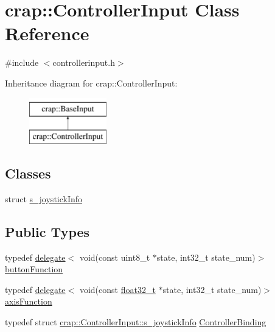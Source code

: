 \hypertarget{classcrap_1_1_controller_input}{}\section{crap\+:\+:Controller\+Input Class Reference}
\label{classcrap_1_1_controller_input}


{\ttfamily \#include $<$controllerinput.\+h$>$}

Inheritance diagram for crap\+:\+:Controller\+Input\+:\begin{figure}[H]
\begin{center}
\leavevmode
\includegraphics[height=2.000000cm]{classcrap_1_1_controller_input}
\end{center}
\end{figure}
\subsection*{Classes}
\begin{DoxyCompactItemize}
\item 
struct \hyperlink{structcrap_1_1_controller_input_1_1s__joystick_info}{s\+\_\+joystick\+Info}
\end{DoxyCompactItemize}
\subsection*{Public Types}
\begin{DoxyCompactItemize}
\item 
typedef \hyperlink{classcrap_1_1delegate}{delegate}$<$ void(const uint8\+\_\+t $\ast$state, int32\+\_\+t state\+\_\+num)$>$ \hyperlink{classcrap_1_1_controller_input_aeacf05e7418322e48e62ce5dd179c7a8}{button\+Function}
\item 
typedef \hyperlink{classcrap_1_1delegate}{delegate}$<$ void(const \hyperlink{crap__types_8h_a4611b605e45ab401f02cab15c5e38715}{float32\+\_\+t} $\ast$state, int32\+\_\+t state\+\_\+num)$>$ \hyperlink{classcrap_1_1_controller_input_aea9c7f407b4c8fb0cea63aa69acccbe1}{axis\+Function}
\item 
typedef struct \hyperlink{structcrap_1_1_controller_input_1_1s__joystick_info}{crap\+::\+Controller\+Input\+::s\+\_\+joystick\+Info} \hyperlink{classcrap_1_1_controller_input_abf7203aadb8392423425653d935afdf4}{Controller\+Binding}
\end{DoxyCompactItemize}

